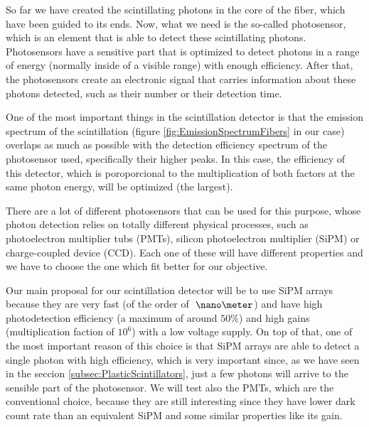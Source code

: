 So far we have created the scintillating photons in the core of the fiber, which have been guided to its ends. Now, what we need is the so-called photosensor, which is an element that is able to detect these scintillating photons. Photosensors have a sensitive part that is optimized to detect photons in a range of energy (normally inside of a visible range) with enough efficiency. After that, the photosensors create an electronic signal that carries information about these photons detected, such as their number or their detection time.

One of the most important things in the scintillation detector is that the emission spectrum of the scintillation (figure \ref{fig:EmissionSpectrumFibers} in our case) overlaps as much as possible with the detection efficiency spectrum of the photosensor used, specifically their higher peaks. In this case, the efficiency of this detector,  which is poroporcional to the multiplication of both factors at the same photon energy, will be optimized (the largest).

There are a lot of different photosensors that can be used for this purpose, whose photon detection relies on totally different physical processes, such as photoelectron multiplier tubs (PMTs), silicon photoelectron multiplier (SiPM) or charge-coupled device (CCD).  Each one of these will have different properties and we have to choose the one which fit better for our objective.

Our main proposal for our scintillation detector will be to use SiPM arrays because they are very fast (of the order of $~\nano\meter$) and have high photodetection efficiency (a maximum of around $50\%$) and high gains (multiplication faction of $10^{6}$) with a low voltage supply. On top of that, one of the most important reason of this choice is that SiPM arrays are able to detect a single photon with high efficiency, which is very important since, as we have seen in the seccion \ref{subsec:PlasticScintillators}, just a few photons will arrive to the sensible part of the photosensor. We will test also the PMTs, which are the conventional choice, because they are still interesting since they have lower dark count rate than an equivalent SiPM and some similar properties like its gain.




